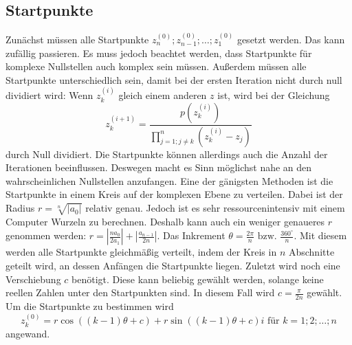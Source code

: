 \documentclass[12pt]{article}
\begin{document}
\subsection{Startpunkte}
Zunächst müssen alle Startpunkte $z_n^{(0)};z_{n-1}^{(0)};\dots;z_1^{(0)}$ gesetzt werden. Das kann zufällig passieren. Es muss jedoch beachtet werden, dass Startpunkte für komplexe Nullstellen auch komplex sein müssen. Außerdem müssen alle Startpunkte unterschiedlich sein, damit bei der ersten Iteration nicht durch null dividiert wird: 
Wenn $z_{k}^{(i)}$ gleich einem anderen $z$ ist, wird bei der Gleichung
\begin{equation*}
    z_k^{(i+1)} = \frac{p(z_{k}^{(i)})}{\prod_{j=1;j\neq k}^{n}(z_{k}^{(i)}-z_j)}
\end{equation*}
durch Null dividiert.
Die Startpunkte können allerdings auch die Anzahl der Iterationen beeinflussen. Deswegen macht es Sinn möglichst nahe an den wahrscheinlichen Nullstellen anzufangen. Eine der gänigsten Methoden ist die Startpunkte in einem Kreis auf der komplexen Ebene zu verteilen. Dabei ist der Radius $r = \sqrt[n]{|a_0|}$ relativ genau. Jedoch ist es sehr ressourcenintensiv mit einem Computer Wurzeln zu berechnen. Deshalb kann auch ein weniger genaueres $r$ genommen werden: $r = |\frac{na_0}{2a_1}| + |\frac{a_{n-1}}{2n}|$.
Das Inkrement $\theta = \frac{2\pi}{n} \text{ bzw. } \frac{360^\circ}{n}$. Mit diesem werden alle Startpunkte gleichmäßig verteilt, indem der Kreis in $n$ Abschnitte geteilt wird, an dessen Anfängen die Startpunkte liegen. Zuletzt wird noch eine Verschiebung $c$ benötigt. Diese kann beliebig gewählt werden, solange keine reellen Zahlen unter den Startpunkten sind. In diesem Fall wird $c = \frac{\pi}{2n}$ gewählt.
Um die Startpunkte zu bestimmen wird 
\[z_{k}^{(0)} = r\cos((k-1)\theta+c)+r\sin((k-1)\theta+c)i \text{ für } k=1;2;\dots;n\]
 angewand.
\end{document}

